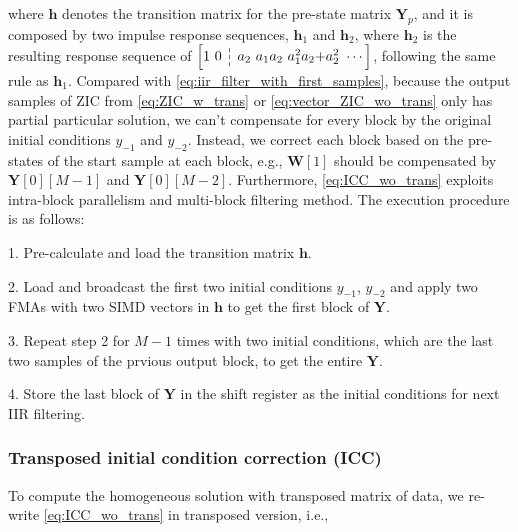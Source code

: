 where $\bm{h}$ denotes the transition matrix for the pre-state matrix $\bm{Y}_p$, and it is composed by
two impulse response sequences, $\bm{h}_1$ and $\bm{h}_2$, where $\bm{h}_2$ is the resulting response sequence of 
$\left[1 ~ 0~ \dashline ~ a_2 ~ a_1a_2 ~ a_1^2a_2{+}a_2^2~\cdots\right]$,
following the same rule as $\bm{h}_1$. Compared with \eqref{eq:iir_filter_with_first_samples}, because the
output samples of ZIC from \eqref{eq:ZIC_w_trans} or \eqref{eq:vector_ZIC_wo_trans} only has partial particular solution,
we can't compensate for every block by the original initial conditions $y_{-1}$ and $y_{-2}$.
Instead, we correct each block based on the pre-states of the start sample at each block, e.g., $\bm{W}[1]$ should
be compensated by $\bm{Y}[0][M-1]$ and $\bm{Y}[0][M-2]$. Furthermore,
\eqref{eq:ICC_wo_trans} exploits intra-block parallelism and multi-block filtering method. 
The execution procedure is as follows:

1. Pre-calculate and load the transition matrix $\bm{h}$.

2. Load and broadcast the first two initial conditions $y_{-1}$, $y_{-2}$ and apply two FMAs with two SIMD vectors 
in $\bm{h}$ to get the first block of $\bm{Y}$.

3. Repeat step 2 for $M{-}1$ times with two initial conditions, which are the last two samples of the prvious output block,
to get the entire $\bm{Y}$.

4. Store the last block of $\bm{Y}$ in the shift register as the initial
conditions for next IIR filtering.

\subsubsection{Transposed initial condition correction (ICC)}

To compute the homogeneous solution with transposed matrix of data, we re-write \eqref{eq:ICC_wo_trans}
in transposed version, i.e.,

